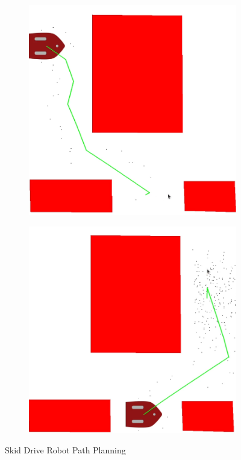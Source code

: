 \documentclass{article}
\begin{document}
\begin{figure}[H]
    \centering
    \begin{subfigure}{0.4\textwidth}
        \centering
        \includegraphics[width = \textwidth]{imgs/path_skid_1.png}
    \end{subfigure}
    \begin{subfigure}{0.4\textwidth}
        \centering
        \includegraphics[width = \textwidth]{imgs/path_skid_2.png}
    \end{subfigure}
    \caption{Skid Drive Robot Path Planning}
    \label{fig:skid-drive-path}
\end{figure}
\end{document}
